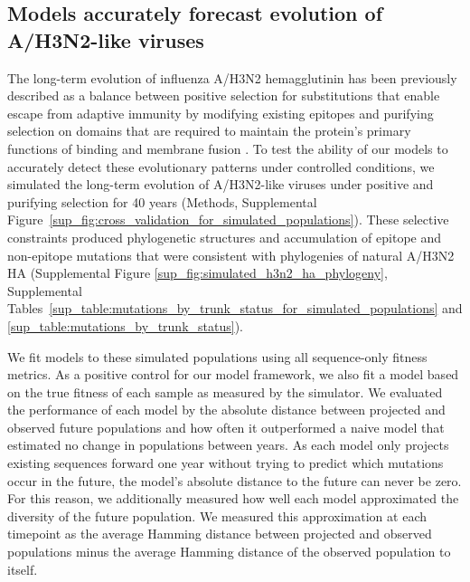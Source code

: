 \subsection*{Models accurately forecast evolution of A/H3N2-like viruses}

The long-term evolution of influenza A/H3N2 hemagglutinin has been previously described as a balance between positive selection for substitutions that enable escape from adaptive immunity by modifying existing epitopes and purifying selection on domains that are required to maintain the protein's primary functions of binding and membrane fusion \cite{Bush:1999vj,Neher2013,Luksza:2014hj,Koelle:2015dh}.
To test the ability of our models to accurately detect these evolutionary patterns under controlled conditions, we simulated the long-term evolution of A/H3N2-like viruses under positive and purifying selection for 40 years (Methods, Supplemental Figure~\ref{sup_fig:cross_validation_for_simulated_populations}).
These selective constraints produced phylogenetic structures and accumulation of epitope and non-epitope mutations that were consistent with phylogenies of natural A/H3N2 HA (Supplemental Figure \ref{sup_fig:simulated_h3n2_ha_phylogeny}, Supplemental Tables~\ref{sup_table:mutations_by_trunk_status_for_simulated_populations} and \ref{sup_table:mutations_by_trunk_status}).

We fit models to these simulated populations using all sequence-only fitness metrics.
As a positive control for our model framework, we also fit a model based on the true fitness of each sample as measured by the simulator.
We evaluated the performance of each model by the absolute distance between projected and observed future populations and how often it outperformed a naive model that estimated no change in populations between years.
As each model only projects existing sequences forward one year without trying to predict which mutations occur in the future, the model's absolute distance to the future can never be zero.
For this reason, we additionally measured how well each model approximated the diversity of the future population.
We measured this approximation at each timepoint as the average Hamming distance between projected and observed populations minus the average Hamming distance of the observed population to itself.

